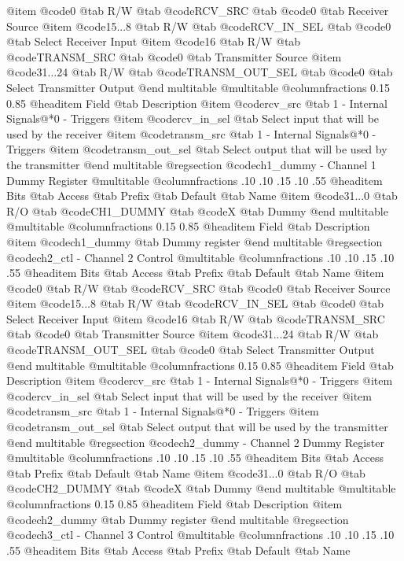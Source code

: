 @item @code{0}
@tab R/W @tab
@code{RCV_SRC}
@tab @code{0} @tab 
Receiver Source
@item @code{15...8}
@tab R/W @tab
@code{RCV_IN_SEL}
@tab @code{0} @tab 
Select Receiver Input
@item @code{16}
@tab R/W @tab
@code{TRANSM_SRC}
@tab @code{0} @tab 
Transmitter Source
@item @code{31...24}
@tab R/W @tab
@code{TRANSM_OUT_SEL}
@tab @code{0} @tab 
Select Transmitter Output
@end multitable
@multitable @columnfractions 0.15 0.85
@headitem Field @tab Description
@item @code{rcv_src} @tab 1 - Internal Signals@*0 - Triggers
@item @code{rcv_in_sel} @tab Select input that will be used by the receiver
@item @code{transm_src} @tab 1 - Internal Signals@*0 - Triggers
@item @code{transm_out_sel} @tab Select output that will be used by the transmitter
@end multitable
@regsection @code{ch1_dummy} - Channel 1 Dummy Register
@multitable @columnfractions .10 .10 .15 .10 .55
@headitem Bits @tab Access @tab Prefix @tab Default @tab Name
@item @code{31...0}
@tab R/O @tab
@code{CH1_DUMMY}
@tab @code{X} @tab 
Dummy
@end multitable
@multitable @columnfractions 0.15 0.85
@headitem Field @tab Description
@item @code{ch1_dummy} @tab Dummy register
@end multitable
@regsection @code{ch2_ctl} - Channel 2 Control
@multitable @columnfractions .10 .10 .15 .10 .55
@headitem Bits @tab Access @tab Prefix @tab Default @tab Name
@item @code{0}
@tab R/W @tab
@code{RCV_SRC}
@tab @code{0} @tab 
Receiver Source
@item @code{15...8}
@tab R/W @tab
@code{RCV_IN_SEL}
@tab @code{0} @tab 
Select Receiver Input
@item @code{16}
@tab R/W @tab
@code{TRANSM_SRC}
@tab @code{0} @tab 
Transmitter Source
@item @code{31...24}
@tab R/W @tab
@code{TRANSM_OUT_SEL}
@tab @code{0} @tab 
Select Transmitter Output
@end multitable
@multitable @columnfractions 0.15 0.85
@headitem Field @tab Description
@item @code{rcv_src} @tab 1 - Internal Signals@*0 - Triggers
@item @code{rcv_in_sel} @tab Select input that will be used by the receiver
@item @code{transm_src} @tab 1 - Internal Signals@*0 - Triggers
@item @code{transm_out_sel} @tab Select output that will be used by the transmitter
@end multitable
@regsection @code{ch2_dummy} - Channel 2 Dummy Register
@multitable @columnfractions .10 .10 .15 .10 .55
@headitem Bits @tab Access @tab Prefix @tab Default @tab Name
@item @code{31...0}
@tab R/O @tab
@code{CH2_DUMMY}
@tab @code{X} @tab 
Dummy
@end multitable
@multitable @columnfractions 0.15 0.85
@headitem Field @tab Description
@item @code{ch2_dummy} @tab Dummy register
@end multitable
@regsection @code{ch3_ctl} - Channel 3 Control
@multitable @columnfractions .10 .10 .15 .10 .55
@headitem Bits @tab Access @tab Prefix @tab Default @tab Name
